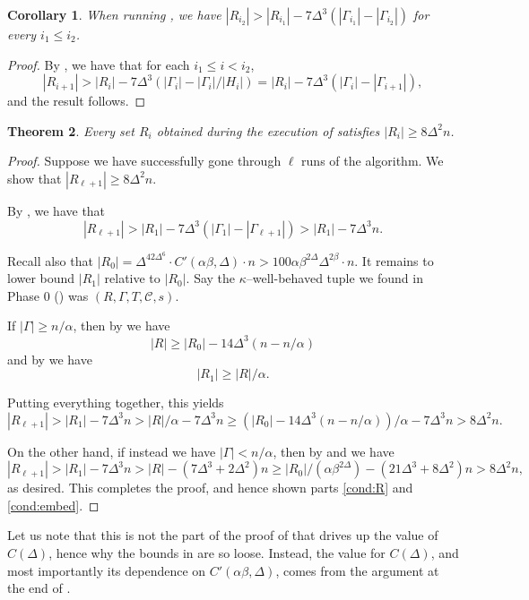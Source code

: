 \documentclass{article}
\newcommand{\cC}{\mathcal{C} }
\newtheorem{theorem}{Theorem}[section]
\newtheorem{corollary}[theorem]{Corollary}
\theoremstyle{definition}
\begin{document}
\begin{corollary}\label{vertex_jump}
    When running , we have $|R_{i_2}|> |R_{i_1}| -7\Delta^3 (|\Gamma_{i_1}| - |\Gamma_{i_2}|)$ for every $i_1\le i_2$.
\end{corollary}

\begin{proof}
    By , we have that for each $i_1\leq i< i_2$, 
    \[|R_{i+1}|> |R_i| - 7\Delta^3 (|\Gamma_i|-|\Gamma_i|/|H_i|) = |R_i| - 7\Delta^3 (|\Gamma_i|-|\Gamma_{i+1}|),\]
    and the result follows.
\end{proof}


\begin{theorem}\label{vertex_count_thm}
    Every set $R_i$ obtained during the execution of  satisfies $|R_i|\geq 8\Delta^2 n$.
\end{theorem}

\begin{proof} Suppose we have successfully gone through $\ell$ runs of the algorithm. We show that $|R_{\ell+1}|\geq 8\Delta^2 n$.

By , we have that $$|R_{\ell+1}|>|R_1|-7\Delta^3(|\Gamma_1|-|\Gamma_{\ell+1}|) > |R_1|-7\Delta^3 n.$$

Recall also that $|R_0| =  \Delta^{42\Delta^6}\cdot C'(\alpha\beta,\Delta) \cdot n > 100\alpha\beta^{2\Delta}\Delta^{2\beta} \cdot n$. It remains to lower bound $|R_1|$ relative to $|R_0|$. Say the $\kappa$--well-behaved tuple we found in Phase 0 () was $(R,\Gamma,T,\cC,s)$.

If $|\Gamma|\ge n/\alpha$, then by  we have $$|R|\geq |R_0|-14\Delta^3(n-n/\alpha)$$ and by  we have 
\[|R_1|\geq |R|/\alpha.\]

Putting everything together, this yields
$$|R_{\ell+1}|>|R_1|-7\Delta^3 n>|R|/\alpha - 7\Delta^3 n \ge (|R_0|-14\Delta^3(n-n/\alpha))/\alpha - 7\Delta^3 n > 8\Delta^2 n.$$

On the other hand, if instead we have $|\Gamma|<n/\alpha$, then by  and  we have
$$|R_{\ell+1}|>|R_1|-7\Delta^3n > |R|-(7\Delta^3+2\Delta^2) n \ge |R_0|/(\alpha\beta^{2\Delta}) - (21\Delta^3 + 8\Delta^2) n > 8\Delta^2 n ,$$
as desired. This completes the proof, and hence shown parts \ref{cond:R} and \ref{cond:embed}.
\end{proof}

Let us note that this is not the part of the proof of  that drives up the value of $C(\Delta)$, hence why the bounds in  are so loose. Instead, the value for $C(\Delta)$, and most importantly its dependence on $C'(\alpha\beta,\Delta)$, comes from the argument at the end of . 
\end{document}
